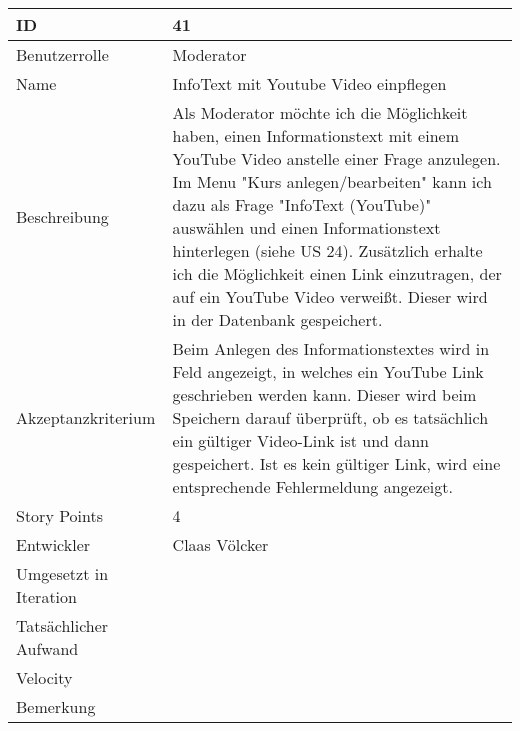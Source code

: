\begin{tabularx}{\textwidth}{|p{}|X|}
	\hline
	ID & 41\\
	\hline
	Benutzerrolle & Moderator\\
	\hline
	Name & InfoText mit Youtube Video einpflegen\\
	\hline
	Beschreibung & Als Moderator möchte ich die Möglichkeit haben, einen Informationstext mit einem YouTube Video anstelle einer Frage anzulegen. Im Menu "Kurs anlegen/bearbeiten" kann ich dazu als Frage "InfoText (YouTube)" auswählen und einen Informationstext hinterlegen (siehe US 24). Zusätzlich erhalte ich die Möglichkeit einen Link einzutragen, der auf ein YouTube Video verweißt. Dieser wird in der Datenbank gespeichert.\\
	\hline
	Akzeptanzkriterium & Beim Anlegen des Informationstextes wird in Feld angezeigt, in welches ein YouTube Link geschrieben werden kann. Dieser wird beim Speichern darauf überprüft, ob es tatsächlich ein gültiger Video-Link ist und dann gespeichert. Ist es kein gültiger Link, wird eine entsprechende Fehlermeldung angezeigt. \\
	\hline
	Story Points & 4\\
	\hline
	Entwickler & Claas Völcker\\
	\hline
	Umgesetzt in Iteration & \\
	\hline
	Tatsächlicher Aufwand & \\
	\hline
	Velocity & \\
	\hline
	Bemerkung & \\
	\hline
\end{tabularx}
\vspace{20pt}
